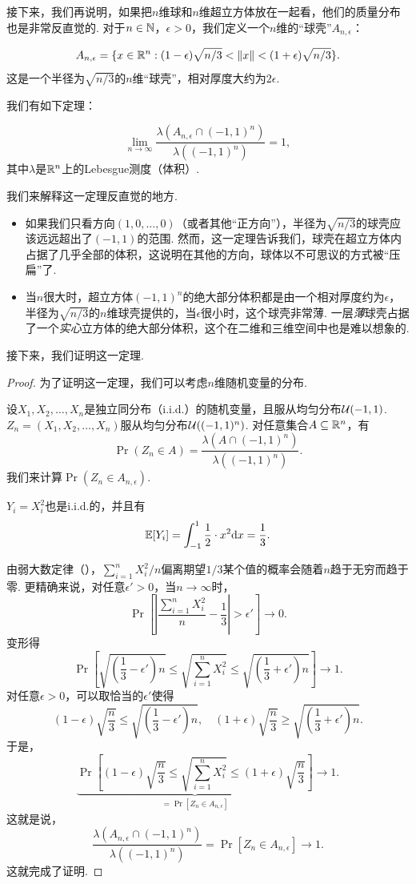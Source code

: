 接下来，我们再说明，如果把$n$维球和$n$维超立方体放在一起看，他们的质量分布也是非常反直觉的. 对于$n \in \mathbb{N}$，$\epsilon>0$，我们定义一个$n$维的“球壳”$A_{n,\epsilon}$：

\[A_{n,\epsilon} = \{x \in \mathbb{R}^n:(1-\epsilon)\sqrt{n/3}<\left\|x\right\|<(1+\epsilon)\sqrt{n/3}\}.\]
这是一个半径为$\sqrt{n/3}$的$n$维“球壳”，相对厚度大约为$2\epsilon$. 

我们有如下定理：
\begin{theorem}
\[\lim_{n\to \infty} \frac{\lambda (A_{n,\epsilon}\cap (-1,1)^n)}{\lambda((-1,1)^n)} = 1,\]
其中$\lambda$是$\mathbb{R}^n$上的Lebesgue测度（体积）. 
\end{theorem}

我们来解释这一定理反直觉的地方. 
\begin{itemize}
    \item 如果我们只看方向$(1,0,\dots,0)$（或者其他“正方向”），半径为$\sqrt{n/3}$的球壳应该远远超出了$(-1,1)$的范围. 然而，这一定理告诉我们，球壳在超立方体内占据了几乎全部的体积，这说明在其他的方向，球体以不可思议的方式被“压扁”了. 
    \item 当$n$很大时，超立方体$(-1,1)^n$的绝大部分体积都是由一个相对厚度约为$\epsilon$，半径为$\sqrt{n/3}$的$n$维球壳提供的，当$\epsilon$很小时，这个球壳非常薄. 一层\textit{薄}球壳占据了一个\textit{实心}立方体的绝大部分体积，这个在二维和三维空间中也是难以想象的. 
\end{itemize}

接下来，我们证明这一定理. 
\begin{proof}

为了证明这一定理，我们可以考虑$n$维随机变量的分布. 

设$X_1, X_2, \dots, X_n$是独立同分布（i.i.d.）的随机变量，且服从均匀分布$\mathcal{U}(-1,1)$. $Z_n=(X_1,X_2,\dots,X_n)$服从均匀分布$\mathcal{U}((-1,1)^n)$. 对任意集合$A\subseteq \mathbb{R}^n$，有
\[\Pr(Z_n\in A) = \frac{\lambda(A\cap (-1,1)^n)}{\lambda((-1,1)^n)}.\]
我们来计算$\Pr(Z_n\in A_{n,\epsilon})$. 

$Y_i=X_i^2$也是i.i.d.的，并且有\[\mathbb{E}[Y_i] = \int_{-1}^1 \frac{1}{2}\cdot x^2 \mathrm{d} x = \frac{1}{3}.\]

由弱大数定律（），$\sum_{i=1}^n X_i^2/n$偏离期望$1/3$某个值的概率会随着$n$趋于无穷而趋于零. 更精确来说，对任意$\epsilon'>0$，当$n\to \infty$时，
\[
\Pr\left[\left|\frac{\sum_{i=1}^n X_i^2}{n}-\frac{1}{3}\right|>\epsilon'\right]\to 0.
\]
变形得
\[
\Pr\left[\sqrt{\left(\frac{1}{3}-\epsilon'\right)n}\leq \sqrt{\sum_{i=1}^nX_i^2}\leq\sqrt{\left(\frac{1}{3}+\epsilon'\right)n}\right]\to 1.
\]
对任意$\epsilon>0$，可以取恰当的$\epsilon'$使得
\[
(1-\epsilon)\sqrt{\frac{n}{3}}\leq \sqrt{\left(\frac{1}{3}-\epsilon'\right)n},\quad (1+\epsilon)\sqrt{\frac{n}{3}}\geq \sqrt{\left(\frac{1}{3}+\epsilon'\right)n}.
\]
于是，
\[
\underbrace{\Pr\left[(1-\epsilon)\sqrt{\frac{n}{3}}\leq \sqrt{\sum_{i=1}^nX_i^2}\leq (1+\epsilon)\sqrt{\frac{n}{3}}\right]}_{=\Pr\left[Z_n \in A_{n,\epsilon}\right]}\to 1.
\]
这就是说，
\[
\frac{\lambda (A_{n,\epsilon}\cap (-1,1)^n)}{\lambda((-1,1)^n)}=\Pr\left[Z_n \in A_{n,\epsilon}\right]\to 1.
\]
这就完成了证明. 
\end{proof}

